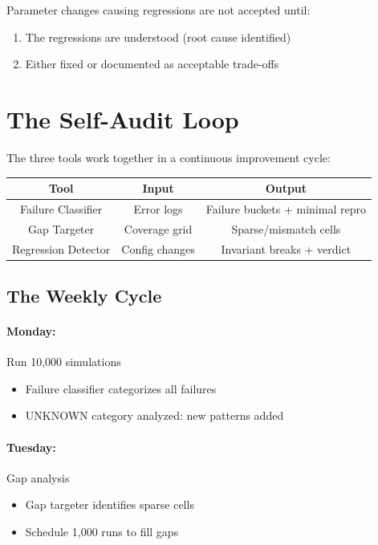 \documentclass[11pt]{article}
\begin{document}
Parameter changes causing regressions are not accepted until:
\begin{enumerate}
\item The regressions are understood (root cause identified)
\item Either fixed or documented as acceptable trade-offs
\end{enumerate}

\section{The Self-Audit Loop}

The three tools work together in a continuous improvement cycle:

\begin{center}
\begin{tabular}{ccc}
\toprule
Tool & Input & Output \\
\midrule
Failure Classifier & Error logs & Failure buckets + minimal repro \\
Gap Targeter & Coverage grid & Sparse/mismatch cells \\
Regression Detector & Config changes & Invariant breaks + verdict \\
\bottomrule
\end{tabular}
\end{center}

\subsection{The Weekly Cycle}

\paragraph{Monday:} Run 10,000 simulations
\begin{itemize}
\item Failure classifier categorizes all failures
\item UNKNOWN category analyzed: new patterns added
\end{itemize}

\paragraph{Tuesday:} Gap analysis
\begin{itemize}
\item Gap targeter identifies sparse cells
\item Schedule 1,000 runs to fill gaps
\end{itemize}
\end{document}
